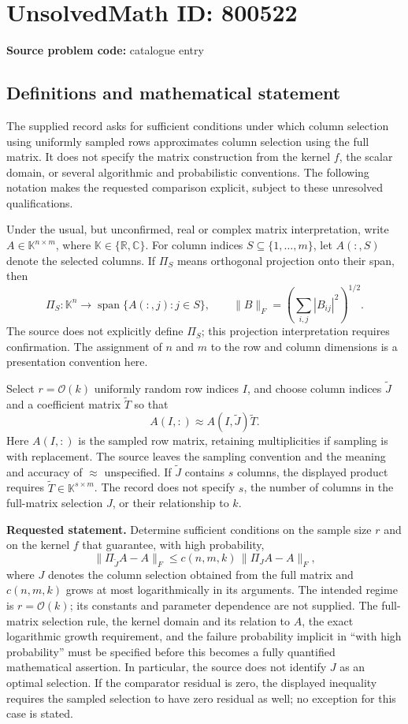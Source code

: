 \documentclass[11pt]{article}
\newcommand{\R}{\mathbb{R}}
\newcommand{\C}{\mathbb{C}}
\begin{document}
\section*{UnsolvedMath ID: 800522}
\textbf{Source problem code:} catalogue entry
\subsection{Definitions and mathematical statement}
The supplied record asks for sufficient conditions under which column selection using uniformly sampled rows approximates column selection using the full matrix. It does not specify the matrix construction from the kernel \(f\), the scalar domain, or several algorithmic and probabilistic conventions. The following notation makes the requested comparison explicit, subject to these unresolved qualifications.

Under the usual, but unconfirmed, real or complex matrix interpretation, write \(A\in\mathbb K^{n\times m}\), where \(\mathbb K\in\{\R,\C\}\). For column indices \(S\subseteq\{1,\ldots,m\}\), let \(A(:,S)\) denote the selected columns. If \(\Pi_S\) means orthogonal projection onto their span, then
\[
\Pi_S:\mathbb K^n\longrightarrow\operatorname{span}\{A(:,j):j\in S\},
\qquad
\|B\|_F=\left(\sum_{i,j}|B_{ij}|^2\right)^{1/2}.
\]
The source does not explicitly define \(\Pi_S\); this projection interpretation requires confirmation. The assignment of \(n\) and \(m\) to the row and column dimensions is a presentation convention here.

Select \(r=\mathcal O(k)\) uniformly random row indices \(I\), and choose column indices \(\widetilde J\) and a coefficient matrix \(\widetilde T\) so that
\[
A(I,:)\approx A(I,\widetilde J)\widetilde T.
\]
Here \(A(I,:)\) is the sampled row matrix, retaining multiplicities if sampling is with replacement. The source leaves the sampling convention and the meaning and accuracy of \(\approx\) unspecified. If \(\widetilde J\) contains \(s\) columns, the displayed product requires \(\widetilde T\in\mathbb K^{s\times m}\). The record does not specify \(s\), the number of columns in the full-matrix selection \(J\), or their relationship to \(k\).

\textbf{Requested statement.} Determine sufficient conditions on the sample size \(r\) and on the kernel \(f\) that guarantee, with high probability,
\[
\bigl\|\Pi_{\widetilde J}A-A\bigr\|_F
\leq c(n,m,k)\,\bigl\|\Pi_JA-A\bigr\|_F,
\]
where \(J\) denotes the column selection obtained from the full matrix and \(c(n,m,k)\) grows at most logarithmically in its arguments. The intended regime is \(r=\mathcal O(k)\); its constants and parameter dependence are not supplied. The full-matrix selection rule, the kernel domain and its relation to \(A\), the exact logarithmic growth requirement, and the failure probability implicit in ``with high probability'' must be specified before this becomes a fully quantified mathematical assertion. In particular, the source does not identify \(J\) as an optimal selection. If the comparator residual is zero, the displayed inequality requires the sampled selection to have zero residual as well; no exception for this case is stated.
\end{document}
